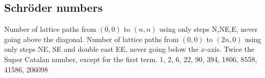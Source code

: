 	\subsection{Schröder numbers}
		Number of lattice paths from $(0,0)$ to $(n,n)$ using only steps N,NE,E, never going above the diagonal. Number of lattice paths from $(0,0)$ to $(2n,0)$ using only steps NE, SE and double east EE, never going below the $x$-axis. Twice the Super Catalan number, except for the first term.
		1, 2, 6, 22, 90, 394, 1806, 8558, 41586, 206098
